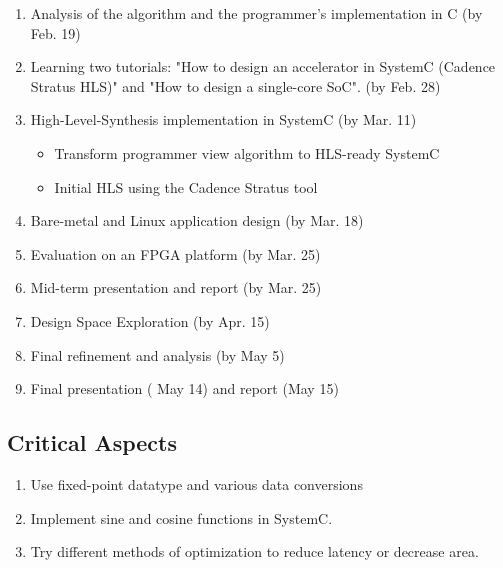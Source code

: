 \documentclass{sig-alternate}
\begin{document}
\vspace{-0.1in}
\begin{enumerate}
\setlength\itemsep{-0.15em}
  \item Analysis of the algorithm and the programmer's implementation in C (by Feb. 19)
  \item Learning two tutorials: "How to design an accelerator in SystemC (Cadence Stratus HLS)" and "How to design a single-core SoC"\cite{esp1}\cite{esp2}. (by Feb. 28)
  \item High-Level-Synthesis implementation in SystemC (by Mar. 11)
  \vspace{-2mm}
       \begin{itemize}
            \item Transform programmer view algorithm to HLS-ready SystemC
            \item Initial HLS using the Cadence Stratus tool
       \end{itemize}

  \item Bare-metal and Linux application design (by Mar. 18)  
  \item Evaluation on an FPGA platform (by Mar. 25)
  \item Mid-term presentation and report (by Mar. 25)
  \item Design Space Exploration (by Apr. 15)
  \item Final refinement and analysis (by May 5)
  \item Final presentation ( May 14) and report (May 15)
\end{enumerate}

\subsection{Critical Aspects}
\begin{enumerate}
\setlength\itemsep{-0.15em}
\item Use fixed-point datatype and various data conversions
\item Implement sine and cosine functions in SystemC.
\item Try different methods of optimization to reduce latency or decrease area.
\end{enumerate}
\end{document}
